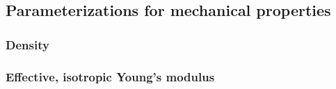 \documentclass[hess, manuscript]{copernicus}
\begin{document}


\subsection{Parameterizations for mechanical properties}
\label{sec:parameterizations}


\subsubsection{Density}




\FloatBarrier

\subsubsection{Effective, isotropic Young's modulus}


\end{document}
